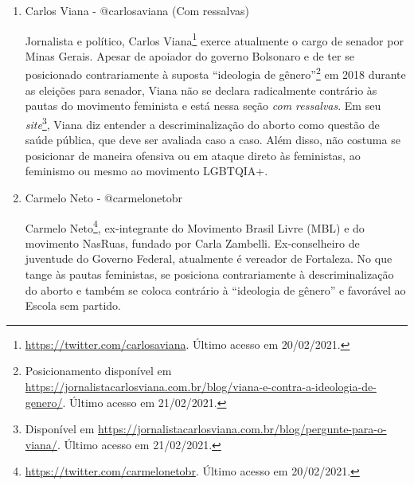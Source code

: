 \documentclass[
	12pt,				%
	openright,			%
	twoside,			%
	a4paper,			%
	english,			%
	brazil				%
	]{abntex2}
\begin{document}
\begin{anexosenv}
\begin{enumerate}
 \begin{figure}[!htbp]
    \centering
    \texttt{[image: cjordy\_2.png]}
    \caption{Postagem no Twitter de Carlos Jordy. Disponível em \url{https://twitter.com/carlosjordy/status/1160231238134849537}. Último acesso em 20/02/2021.}
    \label{fig:carlosj2}
 \end{figure}
 
 
 \newpage
  
  \item Carlos Viana - @carlosaviana (Com ressalvas)
  
   Jornalista e político, Carlos Viana\footnote{\url{https://twitter.com/carlosaviana}. Último acesso em 20/02/2021.} exerce atualmente o cargo de senador por Minas Gerais. Apesar de apoiador do governo Bolsonaro e de ter se posicionado contrariamente à suposta ``ideologia de gênero''\footnote{Posicionamento disponível em \url{https://jornalistacarlosviana.com.br/blog/viana-e-contra-a-ideologia-de-genero/}. Último acesso em 21/02/2021.} em 2018 durante as eleições para senador, Viana não se declara radicalmente contrário às pautas do movimento feminista e está nessa seção \textit{com ressalvas}. Em seu \textit{site}\footnote{Disponível em \url{https://jornalistacarlosviana.com.br/blog/pergunte-para-o-viana/}. Último acesso em 21/02/2021.}, Viana diz entender a descriminalização do aborto como questão de saúde pública, que deve ser avaliada caso a caso. Além disso, não costuma se posicionar de maneira ofensiva ou em ataque direto às feministas, ao feminismo ou mesmo ao movimento LGBTQIA+.
 
  \item Carmelo Neto - @carmelonetobr
  
  Carmelo Neto\footnote{\url{https://twitter.com/carmelonetobr}. Último acesso em 20/02/2021.}, ex-integrante do Movimento Brasil Livre (MBL) e do movimento NasRuas, fundado por Carla Zambelli. Ex-conselheiro de juventude do Governo Federal, atualmente é vereador de Fortaleza. No que tange às pautas feministas, se posiciona contrariamente à descriminalização do aborto e também se coloca contrário à ``ideologia de gênero'' e favorável ao Escola sem partido.
 

\end{enumerate}
\end{anexosenv}
\end{document}
